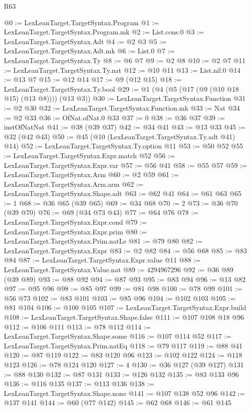 \begin{lexlean}{R63}
\begin{coremodule}
@0 := LexLeanTarget.TargetSyntax.Program
@1 := LexLeanTarget.TargetSyntax.Program.mk
@2 := List.cons.{0}
@3 := LexLeanTarget.TargetSyntax.Adt
@4 := @2 @3
@5 := LexLeanTarget.TargetSyntax.Adt.mk
@6 := List.{0}
@7 := LexLeanTarget.TargetSyntax.Ty
@8 := @6 @7
@9 := @2 @8
@10 := @2 @7
@11 := LexLeanTarget.TargetSyntax.Ty.nat
@12 := @10 @11
@13 := List.nil.{0}
@14 := @13 @7
@15 := @12 @14
@17 := @9 (@12 @15)
@18 := LexLeanTarget.TargetSyntax.Ty.bool
@29 := @1 (@4 (@5 (@17 (@9 (@10 @18 @15) (@13 @8)))) (@13 @3))
@30 := LexLeanTarget.TargetSyntax.Function
@31 := @2 @30
@32 := LexLeanTarget.TargetSyntax.Function.mk
@33 := Nat
@34 := @2 @33
@36 := OfNat.ofNat.{0} @33
@37 := 0
@38 := @36 @37
@39 := instOfNatNat
@41 := @38 (@39 @37)
@42 := @34 @41
@43 := @13 @33
@45 := @32 (@42 @43)
@50 := @45 (@10 (LexLeanTarget.TargetSyntax.Ty.adt @41) @14)
@52 := LexLeanTarget.TargetSyntax.Ty.option @11
@53 := @50 @52
@55 := LexLeanTarget.TargetSyntax.Expr.match @52
@56 := LexLeanTarget.TargetSyntax.Expr.var
@57 := @56 @41
@58 := @55 @57
@59 := LexLeanTarget.TargetSyntax.Arm
@60 := @2 @59
@61 := LexLeanTarget.TargetSyntax.Arm.arm
@62 := LexLeanTarget.TargetSyntax.Shape.adt
@63 := @62 @41
@64 := @61 @63
@65 := 1
@68 := @36 @65 (@39 @65)
@69 := @34 @68
@70 := 2
@73 := @36 @70 (@39 @70)
@76 := @69 (@34 @73 @43)
@77 := @64 @76
@78 := LexLeanTarget.TargetSyntax.Expr.cond
@79 := LexLeanTarget.TargetSyntax.Expr.prim
@80 := LexLeanTarget.TargetSyntax.Prim.natLe
@81 := @79 @80
@82 := LexLeanTarget.TargetSyntax.Expr
@83 := @2 @82
@84 := @56 @68
@85 := @83 @84
@87 := LexLeanTarget.TargetSyntax.Expr.value @11
@88 := LexLeanTarget.TargetSyntax.Value.nat
@89 := 4294967296
@92 := @36 @89 (@39 @89)
@93 := @88 @92
@94 := @87 @93
@95 := @83 @94
@96 := @13 @82
@97 := @95 @96
@98 := @85 @97
@99 := @81 @98
@100 := @78 @99
@101 := @56 @73
@102 := @83 @101
@103 := @85 @96
@104 := @102 @103
@105 := @81 @104
@106 := @100 @105
@107 := LexLeanTarget.TargetSyntax.Expr.build
@108 := LexLeanTarget.TargetSyntax.Shape.false
@111 := @107 @108 @18 @96
@112 := @106 @111
@113 := @78 @112
@114 := LexLeanTarget.TargetSyntax.Shape.some
@116 := @107 @114 @52
@117 := LexLeanTarget.TargetSyntax.Prim.natEq
@118 := @79 @117
@119 := @88 @41
@120 := @87 @119
@122 := @83 @120 @96
@123 := @102 @122
@124 := @118 @123
@126 := @78 @124 @120
@127 := 4
@130 := @36 @127 (@39 @127)
@131 := @88 @130
@132 := @87 @131
@133 := @126 @132
@135 := @83 @133 @96
@136 := @116 @135
@137 := @113 @136
@138 := LexLeanTarget.TargetSyntax.Shape.none
@141 := @107 @138 @52 @96
@142 := @137 @141
@144 := @60 (@77 @142)
@145 := @62 @68
@146 := @61 @145

\end{coremodule}
\end{lexlean}
